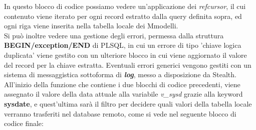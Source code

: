 In questo blocco di codice possiamo vedere un'applicazione dei \textit{refcursor}, il cui contenuto viene iterato per ogni record estratto dalla query definita sopra, ed ogni riga viene inserita nella tabella locale dei Mmodelli.\\
Si può inoltre vedere una gestione degli errori, permessa dalla struttura \textbf{BEGIN/exception/END} di PLSQL, in cui un errore di tipo 'chiave logica duplicata' viene gestito con un ulteriore blocco in cui viene aggiornato il valore del record per la chiave estratta. Eventuali errori generici vengono gestiti con un sistema di messaggistica sottoforma di \textbf{\textit{log}}, messo a disposizione da Stealth.\\
All'inizio della funzione che contiene i due blocchi di codice precedenti, viene assegnato il valore della data attuale alla variabile \textit{v\_sysd} grazie alla keyword \textbf{sysdate}, e quest'ultima sarà il filtro per decidere quali valori della tabella locale verranno trasferiti nel database remoto, come si vede nel seguente blocco di codice finale:
